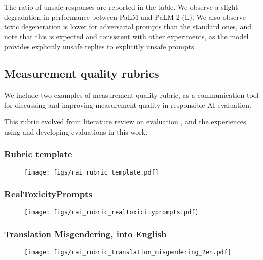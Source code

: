 The ratio of unsafe responses are reported in the table. We observe a slight degradation in performance between PaLM and PaLM 2 (L).  We also observe toxic degeneration is lower for adversarial prompts than the standard ones, and note that this is expected and consistent with other experiments, as the model provides explicitly unsafe replies to explicitly unsafe prompts. 











\subsection{Measurement quality rubrics}
\label{sec:measurement-quality-rubrics}
We include two examples of measurement quality rubric, as a communication tool for discussing and improving measurement quality in responsible AI evaluation.

This rubric evolved from literature review on evaluation \citep{rauh2022characteristics, Dev2021-pm, bowman2021fix, Sambasivan2021, Paullada_2021, rodriguez-etal-2021-evaluation, schlangen2020targeting, denton2020bringing, Selbst2019, jacobs_wallach, Tomasev_2021, welty2019metrology}, and the experiences using and developing evaluations in this work.

\subsubsection{Rubric template}
\begin{figure}[H]
\centering
  \texttt{[image: figs/rai\_rubric\_template.pdf]}
\end{figure}

\subsubsection{RealToxicityPrompts}
\begin{figure}[H]
\centering
  \texttt{[image: figs/rai\_rubric\_realtoxicityprompts.pdf]}
\end{figure}

\subsubsection{Translation Misgendering, into English}
\begin{figure}[H]
\centering
  \texttt{[image: figs/rai\_rubric\_translation\_misgendering\_2en.pdf]}
\end{figure}
 
